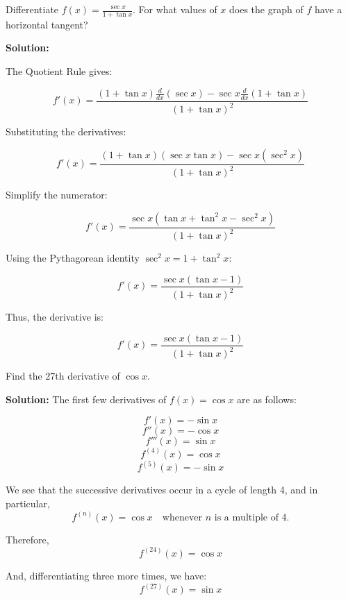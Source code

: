 \documentclass[12pt]{article}
\theoremstyle{beautifulthm}
\begin{document}
\begin{tcolorbox}[colback=examplebg, colframe=red!75!black, title=\textbf{EXAMPLE 1: Derivatives of Trigonometric Functions}, fonttitle=\bfseries, sharp corners]

Differentiate \(f(x) = \frac{\sec x}{1 + \tan x}\). For what values of \(x\) does the graph of \(f\) have a horizontal tangent?

\tcblower
\textbf{Solution:}

The Quotient Rule gives:

\[
f'(x) = \frac{(1 + \tan x) \frac{d}{dx}(\sec x) - \sec x \frac{d}{dx}(1 + \tan x)}{(1 + \tan x)^2}
\]

Substituting the derivatives:

\[
f'(x) = \frac{(1 + \tan x)(\sec x \tan x) - \sec x (\sec^2 x)}{(1 + \tan x)^2}
\]

Simplify the numerator:

\[
f'(x) = \frac{\sec x (\tan x + \tan^2 x - \sec^2 x)}{(1 + \tan x)^2}
\]

Using the Pythagorean identity \(\sec^2 x = 1 + \tan^2 x\):

\[
f'(x) = \frac{\sec x (\tan x - 1)}{(1 + \tan x)^2}
\]

Thus, the derivative is:

\[
f'(x) = \frac{\sec x (\tan x - 1)}{(1 + \tan x)^2}
\]
\end{tcolorbox}



\begin{tcolorbox}[colback=examplebg, colframe=red!75!black, title=\textbf{EXAMPLE 2: Derivatives of Trigonometric Functions}, fonttitle=\bfseries, sharp corners]

Find the 27th derivative of \(\cos x\).

\tcblower
\textbf{Solution:}
The first few derivatives of \(f(x) = \cos x\) are as follows:

\[
f'(x) = -\sin x
\]
\[
f''(x) = -\cos x
\]
\[
f'''(x) = \sin x
\]
\[
f^{(4)}(x) = \cos x
\]
\[
f^{(5)}(x) = -\sin x
\]

We see that the successive derivatives occur in a cycle of length 4, and in particular,
\[
f^{(n)}(x) = \cos x \quad \text{whenever } n \text{ is a multiple of 4.}
\]

Therefore,
\[
f^{(24)}(x) = \cos x
\]

And, differentiating three more times, we have:
\[
f^{(27)}(x) = \sin x
\]

\end{tcolorbox}
\end{document}
